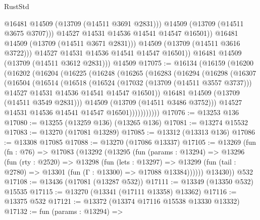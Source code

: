 \begin{lexlean}{RustStd}
\begin{coremodule}
                      @16481
                      @14509
                      (@13709 (@14511 @3691 @2831)))
                    @14509
                    (@13709 (@14511 @3675 @3707)))
                  @14527
                  @14531
                  @14536
                  @14541
                  @14547
                  @16501))
              @16481
              @14509
              (@13709 (@14511 @3671 @2831)))
            @14509
            (@13709 (@14511 @3616 @3722)))
          @14527
          @14531
          @14536
          @14541
          @14547
          @16501))
      @16481
      @14509
      (@13709 (@14511 @3612 @2831)))
    @14509
@17075 := @16134
    (@16159
      (@16200
        (@16202
          (@16204
            (@16225
              (@16248
                (@16265
                  (@16283
                    (@16294
                      (@16298
                        (@16307
                          (@16504
                            (@16514
                              (@16518
                                (@16524
                                  (@17032 (@13709 (@14511 @3557 @3737)))
                                  @14527
                                  @14531
                                  @14536
                                  @14541
                                  @14547
                                  @16501))
                              @16481
                              @14509
                              (@13709 (@14511 @3549 @2831)))
                            @14509
                            (@13709 (@14511 @3486 @3752)))
                          @14527
                          @14531
                          @14536
                          @14541
                          @14547
                          @16501)))))))))))
@17076 := @13253 @136
@17080 := @13255 (@13259 @136) (@13265 @136)
@17081 := @13274 @15532
@17083 := @13270 (@17081 @13289)
@17085 := @13312 (@13313 @136)
@17086 := @13308 @17085
@17088 := @13270 (@17086 @13337)
@17105 := @13269
    (fun (fn : @76) =>
    @17083
      (@13292
        (@13295
          (fun (params : @13294) =>
          @13296
            (fun (rty : @2520) =>
            @13298
              (fun (lets : @13297) =>
              @13299 (fun (tail : @2780) => @13301 (fun (Γ : @13300) => @17088 @13384))))))
        @13430))
    @532
@17108 := @13436 (@17081 (@13287 @532))
@17111 := @13349 (@13350 @532) @15535
@17115 := @13270 (@13341 (@17111 @13358) @13362)
@17116 := @13375 @532
@17121 := @13372 (@13374 @17116 @15538 @13330 @13332)
@17132 := fun (params : @13294) =>

\end{coremodule}
\end{lexlean}
